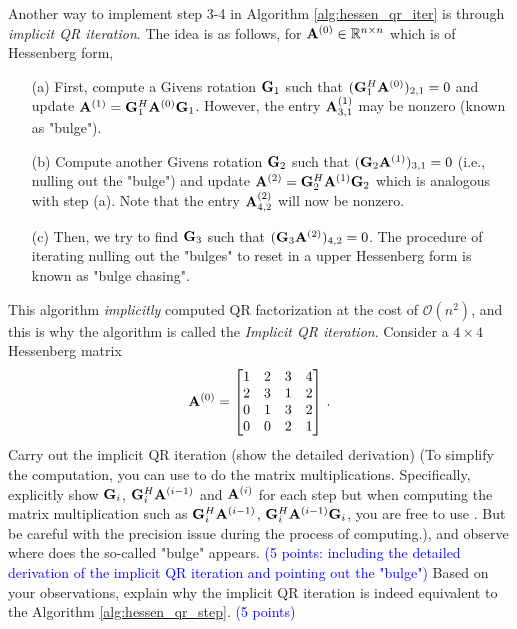 \documentclass[english,onecolumn]{IEEEtran}
\newcommand{\bigO}{\mathcal{O}}
\newcommand{\bA}{{\bf A}}
\newcommand{\bG}{{\bf G}}
\begin{document}
\begin{enumerate}
Another way to implement step 3-4 in Algorithm \ref{alg:hessen_qr_iter} is through \textit{implicit QR iteration}.
The idea is as follows, for $\bA^{(0)}\in \mathbb{R}^{n\times n}$ which is of Hessenberg form,
\begin{enumerate}
    \item[(a)] First, compute a Givens rotation $\bG_1$ such that $(\bG_1^{H}\bA^{(0)})_{2,1} =0$ and update $\bA^{(1)}  = \bG_1^{H} \bA^{(0)} \bG_1$. However, the entry $\bA^{(1)}_{3,1}$ may be nonzero (known as "bulge").
    \item[(b)] Compute another Givens rotation $\bG_2$ such that $(\bG_2\bA^{(1)})_{3,1} =0 $ (i.e., nulling out the "bulge") and update $\bA^{(2)}  = \bG_2^{H} \bA^{(1)} \bG_2$ which is analogous with step (a). Note that the entry $\bA^{(2)}_{4,2}$ will now be nonzero.
    \item[(c)] Then, we try to find $\bG_3$ such that $(\bG_3\bA^{(2)})_{4,2}=0$.
    The procedure of iterating nulling out the "bulges" to reset in a upper Hessenberg form is known as "bulge chasing".
\end{enumerate}
This algorithm \textit{implicitly} computed QR factorization at the cost of $\bigO(n^2)$, and this is why the algorithm is called the \textit{Implicit QR iteration}.
Consider a $4\times 4$ Hessenberg matrix
\[
\bA^{(0)} = \begin{bmatrix}
       1 & 2 & 3 & 4\\
       2 & 3 & 1 & 2\\
       0 & 1 & 3 & 2 \\
       0 & 0 & 2& 1
\end{bmatrix}\,.
\]
Carry out the implicit QR iteration (show the detailed derivation) (To simplify the computation, you can use  to do the matrix multiplications. Specifically, explicitly show $\bG_i$, $\bG_i^H\bA^{(i-1)}$ and $\bA^{(i)}$ for each step but when computing the matrix multiplication such as $\bG_i^H\bA^{(i-1)}$, $\bG_i^H\bA^{(i-1)}\bG_i$, you are free to use . But be careful with the precision issue during the process of computing.), and observe where does the so-called "bulge" appears. \textcolor{blue}{(5 points: including the detailed derivation of the implicit QR iteration and pointing out the "bulge")}
Based on your observations, explain why the implicit QR iteration is indeed equivalent to the Algorithm \ref{alg:hessen_qr_step}. \textcolor{blue}{(5 points)}
\end{enumerate}
\end{document}
